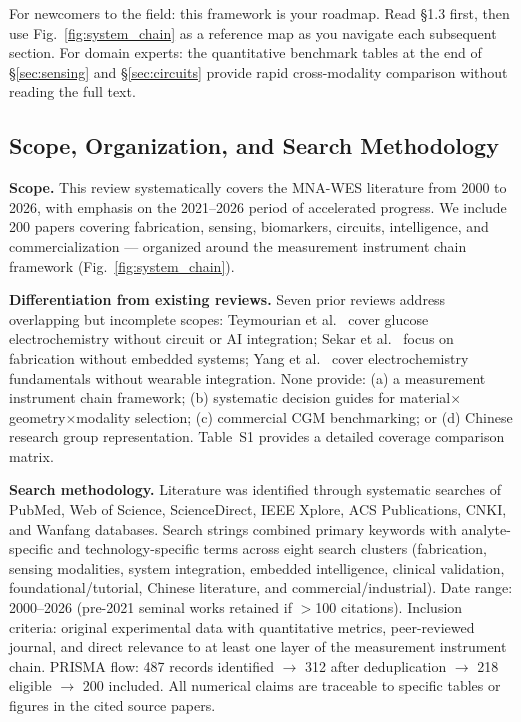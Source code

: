 \documentclass[review,1p]{elsarticle}
\begin{document}
For newcomers to the field: this framework is your roadmap. Read §1.3 first, then use Fig.~\ref{fig:system_chain} as a reference map as you navigate each subsequent section. For domain experts: the quantitative benchmark tables at the end of §\ref{sec:sensing} and §\ref{sec:circuits} provide rapid cross-modality comparison without reading the full text.

\subsection{Scope, Organization, and Search Methodology}
\label{subsec:scope}

\textbf{Scope.} This review systematically covers the MNA-WES literature from 2000 to 2026, with emphasis on the 2021--2026 period of accelerated progress. We include 200 papers covering fabrication, sensing, biomarkers, circuits, intelligence, and commercialization — organized around the measurement instrument chain framework (Fig.~\ref{fig:system_chain}).

\textbf{Differentiation from existing reviews.} Seven prior reviews address overlapping but incomplete scopes: Teymourian et al.\ \cite{TeymourianReview2021} cover glucose electrochemistry without circuit or AI integration; Sekar et al.\ \cite{Sekar2023AdvMater} focus on fabrication without embedded systems; Yang et al.\ \cite{Yang2022ChemSocRev} cover electrochemistry fundamentals without wearable integration. None provide: (a) a measurement instrument chain framework; (b) systematic decision guides for material$\times$geometry$\times$modality selection; (c) commercial CGM benchmarking; or (d) Chinese research group representation. Table~S1 provides a detailed coverage comparison matrix.

\textbf{Search methodology.} Literature was identified through systematic searches of PubMed, Web of Science, ScienceDirect, IEEE Xplore, ACS Publications, CNKI, and Wanfang databases. Search strings combined primary keywords with analyte-specific and technology-specific terms across eight search clusters (fabrication, sensing modalities, system integration, embedded intelligence, clinical validation, foundational/tutorial, Chinese literature, and commercial/industrial). Date range: 2000--2026 (pre-2021 seminal works retained if $>$100 citations). Inclusion criteria: original experimental data with quantitative metrics, peer-reviewed journal, and direct relevance to at least one layer of the measurement instrument chain. PRISMA flow: 487 records identified $\rightarrow$ 312 after deduplication $\rightarrow$ 218 eligible $\rightarrow$ 200 included. All numerical claims are traceable to specific tables or figures in the cited source papers.
\end{document}
